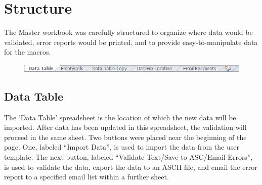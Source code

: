 \documentclass[12pt,a4paper]{report}
\begin{document}
    \section{Structure}
    The Master workbook was carefully structured to organize where data would be validated, error reports would be printed, and to provide easy-to-manipulate data for the macros.
        \begin{figure}[h]
        \centering
        \includegraphics[scale=0.9]{MasterSheets}
        \end{figure}
        \subsection{Data Table}
        The `Data Table' spreadsheet is the location of which the new data will be imported. After data has been updated in this spreadsheet, the validation will proceed in the same sheet.
        \newline
        \newline
        Two buttons were placed near the beginning of the page. One, labeled ``Import Data'', is used to import the data from the user template. The next button, labeled ``Validate Text/Save to ASC/Email Errors'', is used to validate the data, export the data to an ASCII file, and email the error report to a specified email list within a further sheet.
\end{document}
